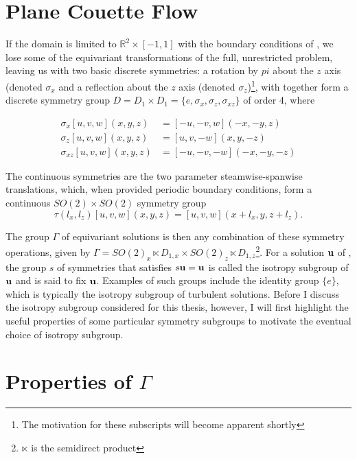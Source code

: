 \section{Plane Couette Flow}

If the domain is limited to $\mathbb{R}^2 \times [-1,1]$ with the boundary conditions of \pCf, we lose some of the equivariant transformations of the full, unrestricted problem, leaving us with two basic discrete symmetries: a rotation by $pi$ about the $z$ axis (denoted $\sigma_x$ and a reflection about the $z$ axis (denoted $\sigma_z$)\footnote{The motivation for these subscripts will become apparent shortly}, with together form a discrete symmetry group $D = D_1 \times D_1 = \{e, \sigma_x,\sigma_z,\sigma_{xz}\}$ of order 4, where

\begin{align}\label{eq:discretesymm}
\sigma_x [u,v,w](x,y,z) &= [-u,-v,w](-x,-y,z)\\
\sigma_z [u,v,w](x,y,z) &= [u,v,-w](x,y,-z)\\
\sigma_{xz} [u,v,w](x,y,z) &= [-u,-v,-w](-x,-y,-z)
\end{align}

The continuous symmetries are the two parameter steamwise-spanwise translations, which, when provided periodic boundary conditions, form a continuous $SO(2)\times SO(2)$ symmetry group 
\begin{equation}\label{eq:contsymm}
\tau(l_x,l_z)[u,v,w](x,y,z) = [u,v,w](x+l_x,y,z+l_z).
\end{equation}

The group $\Gamma$ of equivariant solutions is then any combination of these symmetry operations, given by $\Gamma = SO(2)_x \ltimes D_{1,x} \times SO(2)_z \ltimes D_{1,z}$\footnote{$\ltimes$ is the semidirect product}. For a solution $\mathbf{u}$ of \pCf, the group $s$ of symmetries that satisfies $s\mathbf{u} = \mathbf{u}$ is called the isotropy subgroup of $\mathbf{u}$ and is said to fix $\mathbf{u}$. Examples of such groups include the identity group $\{e\}$, which is typically the isotropy subgroup of turbulent solutions. Before I discuss the isotropy subgroup considered for this thesis, however, I will first highlight the useful properties of some particular symmetry subgroups to motivate the eventual choice of isotropy subgroup. 

\section{Properties of $\Gamma$}


